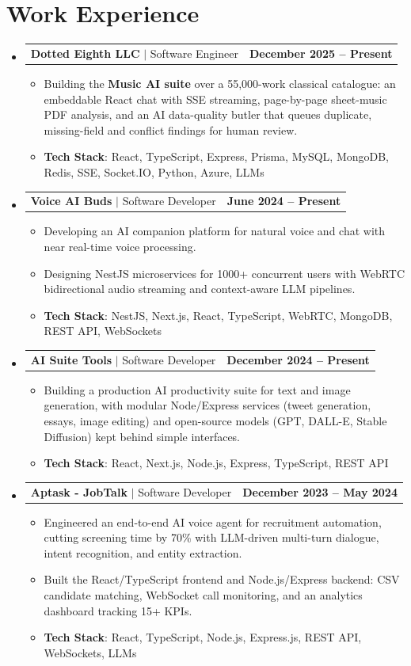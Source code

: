 \documentclass[letterpaper,10pt]{article}
\makeatletter
\newcommand{\resumeItem}[1]{
  \item\small{#1}
}
\newcommand{\resumeExpHeading}[2]{
    \vspace{4pt}\item
    \begin{tabular*}{\textwidth}{l@{\extracolsep{\fill}}r}
      #1 & \textbf{\small #2}\\
    \end{tabular*}
}
\newcommand{\resumeSubHeadingListStart}{\begin{itemize}[leftmargin=0.0in, itemsep=0pt, label={}]}
\newcommand{\resumeItemListStart}{\begin{itemize}}
\newcommand{\resumeItemListEnd}{\end{itemize}}
\makeatother
\begin{document}
\section{Work Experience}
  \resumeSubHeadingListStart
\resumeExpHeading
  {\textbf{Dotted Eighth LLC} $|$ Software Engineer}{December 2025 -- Present}
\resumeItemListStart
\resumeItem{Building the \textbf{Music AI suite} over a 55,000-work classical catalogue: an embeddable React chat with SSE streaming, page-by-page sheet-music PDF analysis, and an AI data-quality butler that queues duplicate, missing-field and conflict findings for human review.}
\resumeItem{\textbf{Tech Stack}: React, TypeScript, Express, Prisma, MySQL, MongoDB, Redis, SSE, Socket.IO, Python, Azure, LLMs}
\resumeItemListEnd

    \resumeExpHeading 
         {\textbf{{Voice AI Buds}} $|$ {Software Developer}}{June 2024 -- Present}
\resumeItemListStart
\resumeItem{Developing an AI companion platform for natural voice and chat with near real-time voice processing.}
\resumeItem{Designing NestJS microservices for 1000+ concurrent users with WebRTC bidirectional audio streaming and context-aware LLM pipelines.}
\resumeItem{\textbf{Tech Stack}: NestJS, Next.js, React, TypeScript, WebRTC, MongoDB, REST API, WebSockets}
\resumeItemListEnd

\resumeExpHeading
  {\textbf{AI Suite Tools} $|$ Software Developer}{December 2024 -- Present}
\resumeItemListStart
\resumeItem{Building a production AI productivity suite for text and image generation, with modular Node/Express services (tweet generation, essays, image editing) and open-source models (GPT, DALL-E, Stable Diffusion) kept behind simple interfaces.}
\resumeItem{\textbf{Tech Stack}: React, Next.js, Node.js, Express, TypeScript, REST API}
\resumeItemListEnd
  
\resumeExpHeading
    {\textbf{Aptask - JobTalk} $|$ {Software Developer}}{December 2023 -- May 2024}
\resumeItemListStart
\resumeItem{Engineered an end-to-end AI voice agent for recruitment automation, cutting screening time by 70\% with LLM-driven multi-turn dialogue, intent recognition, and entity extraction.}
\resumeItem{Built the React/TypeScript frontend and Node.js/Express backend: CSV candidate matching, WebSocket call monitoring, and an analytics dashboard tracking 15+ KPIs.}
\resumeItem{\textbf{Tech Stack}: React, TypeScript, Node.js, Express.js, REST API, WebSockets, LLMs}
\resumeItemListEnd
\resumeItemListEnd

\end{document}
